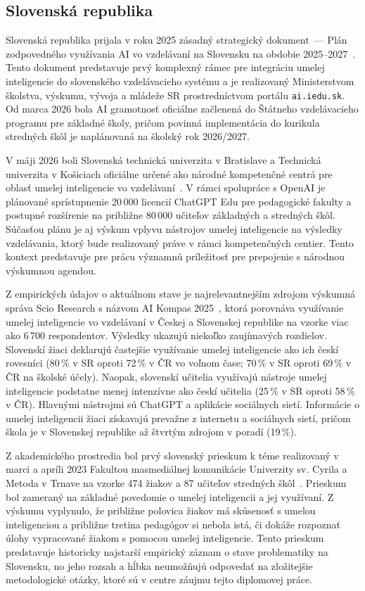 \subsection{Slovenská republika}

Slovenská republika prijala v roku 2025 zásadný strategický dokument~--- Plán zodpovedného využívania AI vo vzdelávaní na Slovensku na obdobie 2025--2027~\cite{minedu2025plan}. Tento dokument predstavuje prvý komplexný rámec pre integráciu umelej inteligencie do slovenského vzdelávacieho systému a je realizovaný Ministerstvom školstva, výskumu, vývoja a mládeže SR prostredníctvom portálu \texttt{ai.iedu.sk}. Od marca 2026 bola AI gramotnosť oficiálne začlenená do Štátneho vzdelávacieho programu pre základné školy, pričom povinná implementácia do kurikula stredných škôl je naplánovaná na školský rok 2026/2027.

V máji 2026 boli Slovenská technická univerzita v Bratislave a Technická univerzita v Košiciach oficiálne určené ako národné kompetenčné centrá pre oblasť umelej inteligencie vo vzdelávaní~\cite{drucker2026competence}. V rámci spolupráce s OpenAI je plánované sprístupnenie 20\,000 licencií ChatGPT Edu pre pedagogické fakulty a postupné rozšírenie na približne 80\,000 učiteľov základných a stredných škôl. Súčasťou plánu je aj výskum vplyvu nástrojov umelej inteligencie na výsledky vzdelávania, ktorý bude realizovaný práve v rámci kompetenčných centier. Tento kontext predstavuje pre prácu významnú príležitosť pre prepojenie s národnou výskumnou agendou.

Z empirických údajov o aktuálnom stave je najrelevantnejším zdrojom výskumná správa Scio Research s názvom AI Kompas 2025~\cite{scio2025aikompas}, ktorá porovnáva využívanie umelej inteligencie vo vzdelávaní v Českej a Slovenskej republike na vzorke viac ako 6\,700 respondentov. Výsledky ukazujú niekoľko zaujímavých rozdielov. Slovenskí žiaci deklarujú častejšie využívanie umelej inteligencie ako ich českí rovesníci (80\,\% v SR oproti 72\,\% v ČR vo voľnom čase; 70\,\% v SR oproti 69\,\% v ČR na školské účely). Naopak, slovenskí učitelia využívajú nástroje umelej inteligencie podstatne menej intenzívne ako českí učitelia (25\,\% v SR oproti 58\,\% v ČR). Hlavnými nástrojmi sú ChatGPT a aplikácie sociálnych sietí. Informácie o umelej inteligencii žiaci získavajú prevažne z internetu a sociálnych sietí, pričom škola je v Slovenskej republike až štvrtým zdrojom v poradí (19\,\%).

Z akademického prostredia bol prvý slovenský prieskum k téme realizovaný v marci a apríli 2023 Fakultou masmediálnej komunikácie Univerzity sv. Cyrila a Metoda v Trnave na vzorke 474 žiakov a 87 učiteľov stredných škôl~\cite{vrabec2023aiskola}. Prieskum bol zameraný na základné povedomie o umelej inteligencii a jej využívaní. Z výskumu vyplynulo, že približne polovica žiakov má skúsenosť s umelou inteligenciou a približne tretina pedagógov si nebola istá, či dokáže rozpoznať úlohy vypracované žiakom s pomocou umelej inteligencie. Tento prieskum predstavuje historicky najstarší empirický záznam o stave problematiky na Slovensku, no jeho rozsah a hĺbka neumožňujú odpovedať na zložitejšie metodologické otázky, ktoré sú v centre záujmu tejto diplomovej práce.

